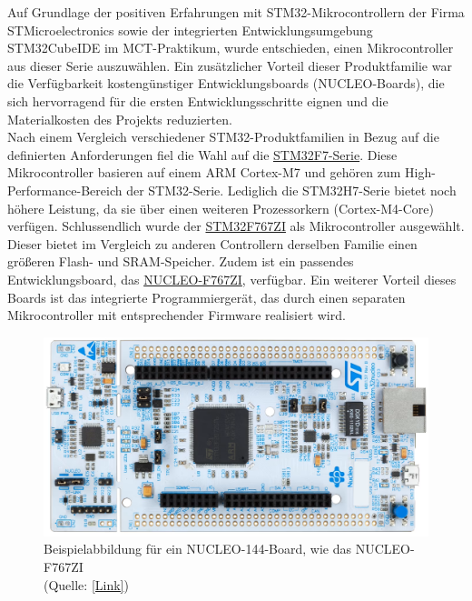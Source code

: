 \documentclass[a4paper, portrait, 12pt]{scrartcl} %
\begin{document}
Auf Grundlage der positiven Erfahrungen mit STM32-Mikrocontrollern der Firma STMicroelectronics sowie der integrierten Entwicklungsumgebung STM32CubeIDE im MCT-Praktikum, wurde entschieden, einen Mikrocontroller aus dieser Serie auszuwählen. Ein zusätzlicher Vorteil dieser Produktfamilie war die Verfügbarkeit kostengünstiger Entwicklungsboards (NUCLEO-Boards), die sich hervorragend für die ersten Entwicklungsschritte eignen und die Materialkosten des Projekts reduzierten.\\

Nach einem Vergleich verschiedener STM32-Produktfamilien in Bezug auf die definierten Anforderungen fiel die Wahl auf die \href{https://www.st.com/en/microcontrollers-microprocessors/stm32f7-series.html}{STM32F7-Serie}. Diese Mikrocontroller basieren auf einem ARM Cortex-M7 und gehören zum High-Performance-Bereich der STM32-Serie. Lediglich die STM32H7-Serie bietet noch höhere Leistung, da sie über einen weiteren Prozessorkern (Cortex-M4-Core) verfügen. Schlussendlich wurde der \href{https://www.st.com/en/microcontrollers-microprocessors/stm32f767zi.html}{STM32F767ZI} als Mikrocontroller ausgewählt. Dieser bietet im Vergleich zu anderen Controllern derselben Familie einen größeren Flash- und SRAM-Speicher. Zudem ist ein passendes Entwicklungsboard, das \href{https://www.st.com/en/evaluation-tools/nucleo-f767zi.html}{NUCLEO-F767ZI}, verfügbar. Ein weiterer Vorteil dieses Boards ist das integrierte Programmiergerät, das durch einen separaten Mikrocontroller mit entsprechender Firmware realisiert wird.\\

\begin{figure}[H]
	\centering
    \includegraphics[scale=0.2]{nucleof767zi.png} 
	\caption{\centering Beispielabbildung für ein NUCLEO-144-Board, wie das NUCLEO-F767ZI\\ (Quelle: \href{https://www.st.com/en/evaluation-tools/nucleo-f767zi.html}{[Link]})}
	\label{fig:nucleo144}
\end{figure}
\end{document}
